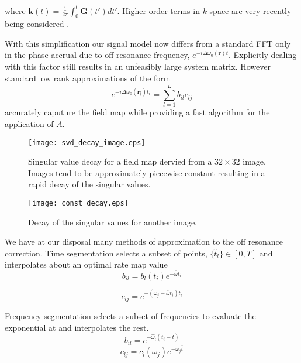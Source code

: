 \documentclass[11pt]{amsart}
\theoremstyle{remark}
\begin{document}
where $\mathbf{k}(t) = \frac{1}{2\pi}\int_0^t \mathbf{G}(t')dt'$. Higher
order terms in $k$-space are very recently being considered \cite{Wilm2011}.

With this simplification our signal model now differs from a standard
FFT only in the phase accrual due to off resonance frequency,
$e^{-i\Delta \omega_0(\mathbf{r})t}$. Explicitly dealing with this
factor
still results in an unfeasibly large system matrix. However standard low rank approximations of the form
\begin{equation}
e^{-i\Delta \omega_0(\mathbf{r_j})t_i} = \sum_{l=1}^L b_{il}c_{lj}
\end{equation}
accurately caputure the field map while providing a fast algorithm for
the application of $A$.

\begin{center}
\begin{figure}
\texttt{[image: svd\_decay\_image.eps]}
\caption{Singular value decay for a field map dervied from a $32\times 32$ image. Images tend to be approximately piecewise constant resulting in a rapid decay of the singular values.}
\end{figure}
\end{center}


\begin{center}
\begin{figure}
\texttt{[image: const\_decay.eps]}
\caption{Decay of the singular values for another image.}
\end{figure}
\end{center}

We have at our disposal many methods of approximation to the off
resonance correction. Time segmentation \cite{Sutton2003} selects a subset of points, $\{ \hat{t}_l \} \in [0,T]$ and interpolates about an optimal rate map value
\begin{equation}
b_{il} = b_l(t_i)e^{-\overline{\omega}t_i}
\end{equation}

\begin{equation}
c_{lj} = e^{-(\omega_j - \overline{\omega}t_i)\hat{t}_l}
\end{equation}

Frequency segmentation \cite{Man} selects a subset of frequencies to evaluate the exponential at and interpolates the rest.
\begin{equation}
b_{il} = e^{-\hat{\omega}_l(t_i - \overline{t})}
\end{equation}
\begin{equation}
c_{lj} = c_l(\omega_j) e^{-\omega_j\overline{t}}
\end{equation}
\end{document}
